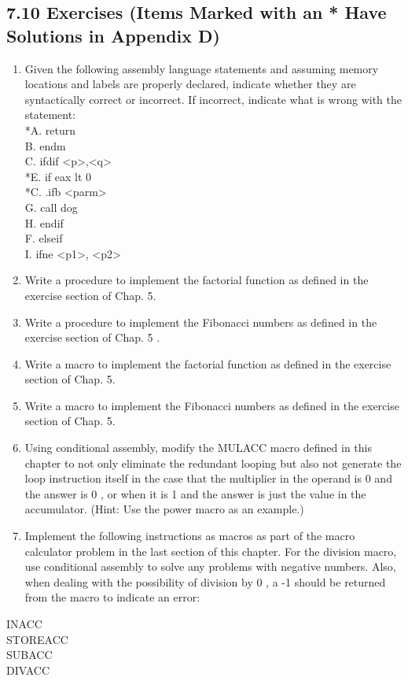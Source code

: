 \documentclass[10pt]{book}
\begin{document}
\subsection*{7.10 Exercises (Items Marked with an * Have Solutions in Appendix D)}
\begin{enumerate}
  \item Given the following assembly language statements and assuming memory locations and labels are properly declared, indicate whether they are syntactically correct or incorrect. If incorrect, indicate what is wrong with the statement:\\
*A. return\\
B. endm\\
C. ifdif <p>,<q>\\
*E. if eax lt 0\\
*C. .ifb <parm>\\
G. call dog\\
H. endif\\
F. elseif\\
I. ifne <p1>, <p2>
  \item Write a procedure to implement the factorial function as defined in the exercise section of Chap. 5.
  \item Write a procedure to implement the Fibonacci numbers as defined in the exercise section of Chap. 5 .
  \item Write a macro to implement the factorial function as defined in the exercise section of Chap. 5.
  \item Write a macro to implement the Fibonacci numbers as defined in the exercise section of Chap. 5.
  \item Using conditional assembly, modify the MULACC macro defined in this chapter to not only eliminate the redundant looping but also not generate the loop instruction itself in the case that the multiplier in the operand is 0 and the answer is 0 , or when it is 1 and the answer is just the value in the accumulator. (Hint: Use the power macro as an example.)
  \item Implement the following instructions as macros as part of the macro calculator problem in the last section of this chapter. For the division macro, use conditional assembly to solve any problems with negative numbers. Also, when dealing with the possibility of division by 0 , a -1 should be returned from the macro to indicate an error:
\end{enumerate}


INACC\\
STOREACC\\
SUBACC\\
DIVACC
\end{document}
